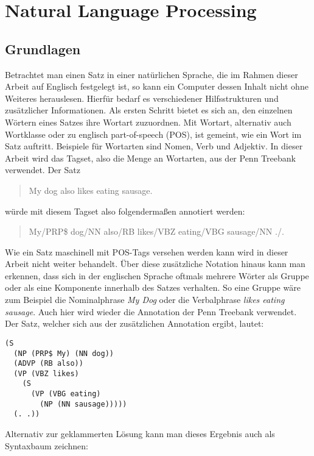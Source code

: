 %
\chapter{Natural Language Processing}
\label{sec:nlp}

\section{Grundlagen}
\label{sec:nlp:grundlagen}

Betrachtet man einen Satz in einer natürlichen Sprache, die im Rahmen dieser Arbeit auf Englisch festgelegt ist, so kann ein Computer dessen Inhalt nicht ohne Weiteres herauslesen. Hierfür bedarf es verschiedener Hilfsstrukturen und zusätzlicher Informationen. Als ersten Schritt bietet es sich an, den einzelnen Wörtern eines Satzes ihre Wortart zuzuordnen. Mit Wortart, alternativ auch Wortklasse oder zu englisch part-of-speech (POS), ist gemeint, wie ein Wort im Satz auftritt. Beispiele für Wortarten sind Nomen, Verb und Adjektiv. In dieser Arbeit wird das Tagset, also die Menge an Wortarten, aus der Penn Treebank verwendet. %
Der Satz
\begin{quote}
My dog also likes eating sausage.
\end{quote}
würde mit diesem Tagset also folgendermaßen annotiert werden:
\begin{quote}
My/PRP\$ dog/NN also/RB likes/VBZ eating/VBG sausage/NN ./.
\end{quote}
Wie ein Satz maschinell mit POS-Tags versehen werden kann wird in dieser Arbeit nicht weiter behandelt. 
Über diese zusätzliche Notation hinaus kann man erkennen, dass sich in der englischen Sprache oftmals mehrere Wörter als Gruppe oder als eine Komponente innerhalb des Satzes verhalten. So eine Gruppe wäre zum Beispiel die Nominalphrase \textit{My Dog} oder die Verbalphrase \textit{likes eating sausage}. Auch hier wird wieder die Annotation der Penn Treebank verwendet. %
Der Satz, welcher sich aus der zusätzlichen Annotation ergibt, lautet:
\begin{lstlisting}
(S
  (NP (PRP$ My) (NN dog))
  (ADVP (RB also))
  (VP (VBZ likes)
    (S
      (VP (VBG eating)
        (NP (NN sausage)))))
  (. .))
\end{lstlisting}
Alternativ zur geklammerten Lösung kann man dieses Ergebnis auch als Syntaxbaum zeichnen:\\

